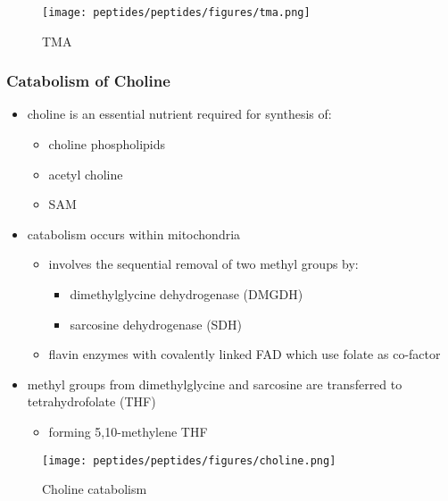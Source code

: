 \documentclass{scrartcl}
\begin{document}
\begin{figure}[htbp]
\centering
\texttt{[image: peptides/peptides/figures/tma.png]}
\caption{\label{fig:org25af4c1}TMA}
\end{figure}

\subsubsection{Catabolism of Choline}
\label{sec:orgc785a7b}
\begin{itemize}
\item choline is an essential nutrient required for synthesis of:
\begin{itemize}
\item choline phospholipids
\item acetyl choline
\item SAM
\end{itemize}
\item catabolism occurs within mitochondria
\begin{itemize}
\item involves the sequential removal of two methyl groups by:
\begin{itemize}
\item dimethylglycine dehydrogenase (DMGDH)
\item sarcosine dehydrogenase (SDH)
\end{itemize}
\item flavin enzymes with covalently linked FAD which use folate as co-factor
\end{itemize}
\item methyl groups from dimethylglycine and sarcosine are transferred to
tetrahydrofolate (THF)
\begin{itemize}
\item forming 5,10-methylene THF
\end{itemize}
\end{itemize}

\begin{figure}[htbp]
\centering
\texttt{[image: peptides/peptides/figures/choline.png]}
\caption{\label{fig:org6c23dbb}Choline catabolism}
\end{figure}
\end{document}
